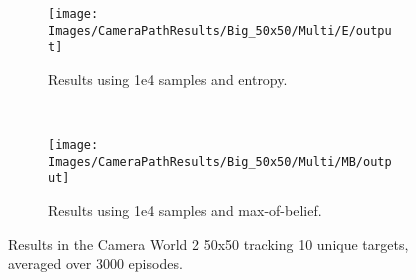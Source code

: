 \begin{figure}[ht]
        \centering
        \begin{subfigure}[t]{0.5\textwidth}
                \texttt{[image: Images/CameraPathResults/Big\_50x50/Multi/E/output]}
                \caption{Results using 1e4 samples and entropy.}
                \label{fig:cpb4e10}
        \end{subfigure}%
        ~ %
        \begin{subfigure}[t]{0.5\textwidth}
                \texttt{[image: Images/CameraPathResults/Big\_50x50/Multi/MB/output]}
                \caption{Results using 1e4 samples and max-of-belief.}
                \label{fig:cpb5mb10}
        \end{subfigure}
        \caption{Results in the Camera World 2 50x50 tracking 10 unique targets, averaged over 3000 episodes.}\label{fig:cpb10}
\end{figure}


